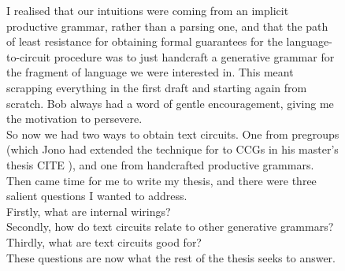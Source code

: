 \begin{figure}[h!]
\centering
{}
\caption{I realised that our intuitions were coming from an implicit productive grammar, rather than a parsing one, and that the path of least resistance for obtaining formal guarantees for the language-to-circuit procedure was to just handcraft a generative grammar for the fragment of language we were interested in. This meant scrapping everything in the first draft and starting again from scratch. Bob always had a word of gentle encouragement, giving me the motivation to persevere.\\

So now we had two ways to obtain text circuits. One from pregroups (which Jono had extended the technique for to CCGs in his master's thesis \bR CITE \e), and one from handcrafted productive grammars. Then came time for me to write my thesis, and there were three salient questions I wanted to address.\\
Firstly, what are internal wirings?\\
Secondly, how do text circuits relate to other generative grammars?\\
Thirdly, what are text circuits good for?\\
These questions are now what the rest of the thesis seeks to answer.
}
\end{figure}
